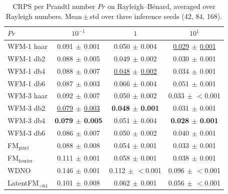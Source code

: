 \begin{table}[ht]
\centering
\caption{CRPS per Prandtl number $Pr$ on Rayleigh--B\'enard, averaged over Rayleigh numbers. Mean\,$\pm$\,std over three inference seeds (42, 84, 168).}
\label{tab:ablation_rb_crps_pr}
\begin{tabular}{lccc}
\toprule
$Pr$ & $10^{-1}$ & $1$ & $10^{1}$ \\
\midrule
WFM-1 haar & 0.091{\scriptsize$\,\pm\,$0.001} & 0.050{\scriptsize$\,\pm\,$0.004} & \underline{0.029{\scriptsize$\,\pm\,$0.001}} \\
WFM-1 db2 & 0.088{\scriptsize$\,\pm\,$0.005} & 0.049{\scriptsize$\,\pm\,$0.002} & 0.030{\scriptsize$\,\pm\,$0.001} \\
WFM-1 db4 & 0.088{\scriptsize$\,\pm\,$0.007} & \underline{0.048{\scriptsize$\,\pm\,$0.002}} & 0.034{\scriptsize$\,\pm\,$0.001} \\
WFM-1 db6 & 0.087{\scriptsize$\,\pm\,$0.003} & 0.066{\scriptsize$\,\pm\,$0.004} & 0.051{\scriptsize$\,\pm\,$0.001} \\
\midrule
WFM-3 haar & 0.092{\scriptsize$\,\pm\,$0.007} & 0.050{\scriptsize$\,\pm\,$0.002} & 0.033{\scriptsize$\,\pm\,$$<$0.001} \\
WFM-3 db2 & \underline{0.079{\scriptsize$\,\pm\,$0.003}} & \textbf{0.048{\scriptsize$\,\pm\,$0.001}} & 0.031{\scriptsize$\,\pm\,$0.001} \\
WFM-3 db4 & \textbf{0.079{\scriptsize$\,\pm\,$0.005}} & 0.051{\scriptsize$\,\pm\,$0.004} & \textbf{0.028{\scriptsize$\,\pm\,$0.001}} \\
WFM-3 db6 & 0.086{\scriptsize$\,\pm\,$0.007} & 0.050{\scriptsize$\,\pm\,$0.002} & 0.040{\scriptsize$\,\pm\,$0.001} \\
\midrule
FM$_\text{pixel}$ & 0.088{\scriptsize$\,\pm\,$0.008} & 0.054{\scriptsize$\,\pm\,$0.001} & 0.033{\scriptsize$\,\pm\,$0.001} \\
FM$_\text{fourier}$ & 0.111{\scriptsize$\,\pm\,$0.001} & 0.058{\scriptsize$\,\pm\,$0.001} & 0.038{\scriptsize$\,\pm\,$0.001} \\
WDNO & 0.146{\scriptsize$\,\pm\,$0.001} & 0.112{\scriptsize$\,\pm\,$$<$0.001} & 0.096{\scriptsize$\,\pm\,$$<$0.001} \\
LatentFM$_{\div 64}$ & 0.101{\scriptsize$\,\pm\,$0.008} & 0.062{\scriptsize$\,\pm\,$0.001} & 0.056{\scriptsize$\,\pm\,$$<$0.001} \\
\bottomrule
\end{tabular}
\end{table}
